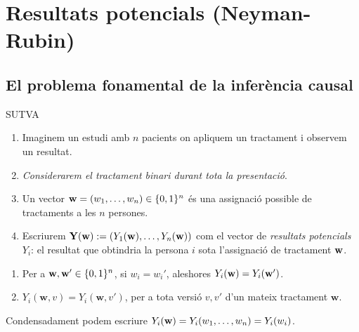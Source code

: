 \documentclass{bestbeamer}
\begin{document}
\section{Resultats potencials (Neyman-Rubin)}
\subsection{El problema fonamental de la inferència causal}

\begin{frame}{SUTVA}
\begin{enumerate}
  \item Imaginem un estudi amb $n$ pacients on apliquem un tractament i observem un resultat.
  \item \textit{Considerarem el tractament binari durant tota la presentació}.
  \item Un vector $\mathbf{w}=(w_1,\dotsc,w_n)\in\{0,1\}^n$ és una assignació possible de tractaments a les $n$ persones.
  \item Escriurem $\mathbf{Y}(\mathbf{w}):=(Y_1(\mathbf{w}),\dotsc,Y_n(\mathbf{w}))$ com el vector de \textit{resultats potencials} $Y_i$: el resultat que obtindria la persona $i$ sota l'assignació de tractament $\mathbf{w}$.
\end{enumerate}
\begin{definition}[SUTVA]\label{def:sutva}
\vspace{-1mm}
\begin{enumerate}
  \item Per a $\mathbf{w},\mathbf{w}'\in\{0,1\}^n$, si $w_i=w_i'$, aleshores $Y_i(\mathbf{w})=Y_i(\mathbf{w}')$.
  \item $Y_i(\mathbf{w},v)=Y_i(\mathbf{w},v')$, per a tota versió $v,v'$ d'un mateix tractament $\mathbf{w}$.
\end{enumerate}
Condensadament podem escriure $Y_i(\mathbf{w})=Y_i(w_1,\dotsc,w_n)=Y_i(w_i)$.
\end{definition}
\end{frame}
\end{document}
